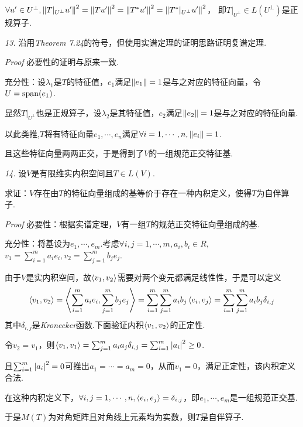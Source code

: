 \(\forall u' \in U^\bot,\left\lVert T|_{U^\bot}u' \right\rVert^2=\left\lVert Tu' \right\rVert^2=\left\lVert T^*u' \right\rVert^2=\left\lVert T^*|_{U^\bot}u' \right\rVert^2\)，
即\(T|_{U^\bot} \in L(U^\bot)\)是正规算子.

\hspace*{\fill}

\textit{13.}
沿用\textit{Theorem 7.24}的符号，但使用实谱定理的证明思路证明复谱定理.

\textit{Proof}
必要性的证明与原来一致.

充分性：设\(\lambda_1\)是\(T\)的特征值，\(e_1\)满足\(\left\lVert e_1 \right\rVert=1\)是与之对应的特征向量，令\(U=\mathrm{span}(e_1)\).

显然\(T|_{U^\bot}\)也是正规算子，设\(\lambda_2\)是其特征值，\(e_2\)满足\(\left\lVert e_2 \right\rVert=1\)是与之对应的特征向量.

以此类推,\(T\)将有特征向量\(e_1,\cdots,e_n\)满足\(\forall i=1,\cdots,n,\left\lVert e_i \right\rVert=1\).

且这些特征向量两两正交，于是得到了\(V\)的一组规范正交特征基.

\hspace*{\fill}

\textit{14.}
设\(V\)是有限维实内积空间且\(T \in L(V)\).

求证：\(V\)存在由\(T\)的特征向量组成的基等价于存在一种内积定义，使得\(T\)为自伴算子.

\textit{Proof}
必要性：根据实谱定理，\(V\)有一组\(T\)的规范正交特征向量组成的基.

充分性：将基设为\(e_1,\cdots,e_m\).考虑\(\forall i,j=1,\cdots,m,a_i,b_i \in R,\)
\(v_1=\sum_{i=1}^m a_ie_i,v_2=\sum_{j=1}^m b_je_j\).

由于\(V\)是实内积空间，故\(\left\langle v_1,v_2 \right\rangle\)需要对两个变元都满足线性性，于是可以定义
    \begin{align*}
        \left\langle v_1,v_2 \right\rangle=\left\langle \sum_{i=1}^m a_ie_i,\sum_{j=1}^m b_je_j \right\rangle=
        \sum_{i=1}^m \sum_{j=1}^m a_ib_j \left\langle e_i,e_j \right\rangle=\sum_{i=1}^m \sum_{j=1}^m a_ib_j\delta_{i,j}
    \end{align*}
其中\(\delta_{i,j}\)是\textit{Kronecker}函数.下面验证内积\(\left\langle v_1,v_2 \right\rangle\)的正定性.

令\(v_2=v_1\)，则\(\left\langle v_1,v_1 \right\rangle=\sum_{j=1}^m a_ia_j\delta_{i,j}=\sum_{i=1}^m \left\lvert a_i \right\rvert^2 \geq 0\).

且\(\sum_{i=1}^m \left\lvert a_i \right\rvert^2=0\)可推出\(a_1=\cdots=a_m=0\)，从而\(v_1=0\)，满足正定性，该内积定义合法.

在这种内积定义下，\(\forall i,j=1,\cdots,n,\left\langle e_i,e_j \right\rangle=\delta_{i,j}\)，即\(e_1,\cdots,e_m\)是一组规范正交基.

于是\(M(T)\)为对角矩阵且对角线上元素均为实数，则\(T\)是自伴算子.

